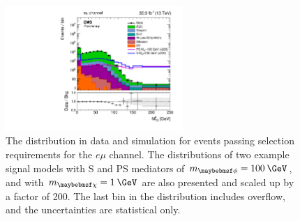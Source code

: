 \begin{figure}
  \includegraphics[width=0.6\textwidth]{figs/mt2log_em.pdf}
  \caption{The \mttll distribution in data and simulation for events passing selection requirements for the $e\mu$ channel. The distributions of two example signal models with S and PS mediators of $\mMed = 100\:\GeV$, and with $\mDM=1\:\GeV$ are also presented and scaled up by a factor of 200. The last bin in the distribution includes overflow, and the uncertainties are statistical only.}
  \label{fig:mt2ll}
\end{figure}


